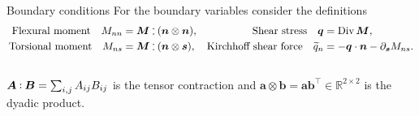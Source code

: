 \documentclass[aspectratio=169]{ISAE-Beamer}
\DeclareMathOperator*{\Div}{Div}
\def\onedot{$\mathsurround0pt\ldotp$}
\def\cddot{%
	\mathbin{\vcenter{\baselineskip.67ex
			\hbox{\onedot}\hbox{\onedot}}%
}}
\begin{document}
\begin{frame}{Boundary conditions}
For the boundary variables consider the definitions
\begin{equation*}
\begin{aligned}
\text{Flexural moment} \quad M_{nn} &= \bm{M} \cddot (\bm{n}\otimes\bm{n}), \\
\text{Torsional moment} \quad M_{ns} &= \bm{M} \cddot (\bm{n}\otimes\bm{s}),
\end{aligned} \quad
\begin{aligned}
\text{Shear stress} \quad \bm{q} &= \Div \bm{M}, \\
\text{Kirchhoff shear force} \quad \widetilde{q}_n &= - \bm{q}\cdot \bm{n} - \partial_{\bm{s}} M_{ns}.
\end{aligned}
\end{equation*} \\
$\bm{A} \cddot \bm{B} = \sum_{i, j} A_{ij} B_{ij}$ is the tensor contraction and $\bm{a} \otimes \bm{b} = \bm{a} \bm{b}^\top \in \mathbb{R}^{2\times 2}$ is the dyadic product. \\
\begin{tcolorbox}
	\centering

\end{tcolorbox}
\end{frame}
\end{document}
